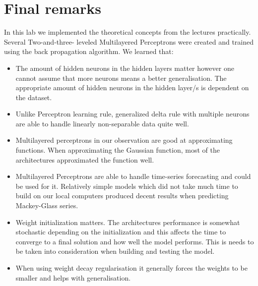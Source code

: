 \documentclass[a4paper]{article}
\begin{document}
\section{Final remarks }
In this lab we implemented the theoretical concepts from the lectures practically. Several Two-and-three- leveled Multilayered Perceptrons were created and trained using the back propagation algorithm. We learned that:
\begin{itemize}
    \item The amount of hidden neurons in the hidden layers matter however one cannot assume that more neurons means a better generalisation. The appropriate amount of hidden neurons in the hidden layer/s is dependent on the dataset.
    \item Unlike Perceptron learning rule, generalized delta rule with multiple neurons are able to handle linearly non-separable data quite well. 
\item Multilayered perceptrons in our observation are good at approximating functions. When approximating the Gaussian function, most of the architectures approximated the function well.
    \item Multilayered Perceptrons are able to handle time-series forecasting and could be used for it. Relatively simple models which did not take much time to build on our local computers produced decent results when predicting Mackey-Glass series.
    \item Weight initialization matters. The architectures performance is somewhat stochastic depending on the initialization and this affects the time to converge to a final solution and how well the model performs. This is needs to be taken into consideration when building and testing the model.
\item When using weight decay regularisation it generally forces the weights to be smaller and helps with generalisation.
\end{itemize}
\end{document}
